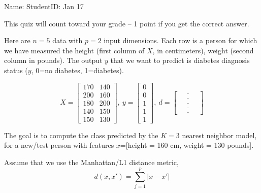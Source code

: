\documentclass{article}
\begin{document}
\thispagestyle{empty}

Name: \underline{\hspace{2in}} StudentID: \underline{\hspace{2in}} Jan 17 

This quiz will count toward your grade -- 1 point if you get the
correct answer.

Here are $n=5$ data with $p=2$ input dimensions. Each row is a person
for which we have measured the height (first column of $X$, in
centimeters), weight (second column in pounds). The output $y$ that we
want to predict is diabetes diagnosis status ($y$, 0=no diabetes,
1=diabetes).

\begin{equation*}
  X = \left[\begin{array}{cc}
              170 & 140 \\
              200 & 160 \\
              180 & 200 \\
              140 & 150 \\
              150 & 130
\end{array}\right],\ 
  y = \left[\begin{array}{c}
              0 \\
              0 \\
              1 \\
              1 \\
              1
\end{array}\right],\ 
  d = \left[\begin{array}{c}
              \underline{\hspace{1cm}}\\
              \underline{\hspace{1cm}}\\
              \underline{\hspace{1cm}}\\
              \underline{\hspace{1cm}}\\
              \underline{\hspace{1cm}}
\end{array}\right]
\end{equation*}

The goal is to compute the class predicted by the $K=3$ nearest
neighbor model, for a new/test person with features $x$=[height = 160 cm,
weight = 130 pounds].

Assume that we use the Manhattan/L1 distance metric,
\begin{equation*}
  d(x,x') = \sum_{j=1}^p |x-x'|
\end{equation*}
\end{document}
